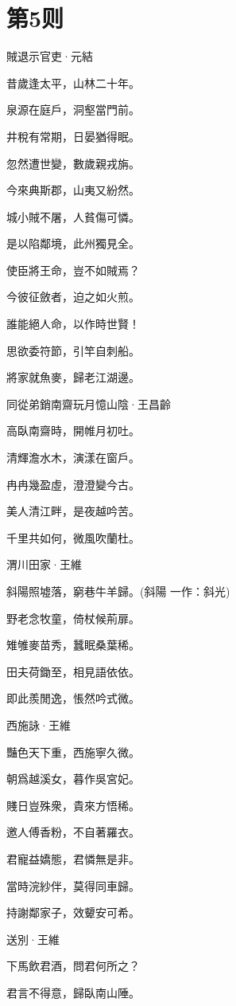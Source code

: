 \documentclass[12pt,a4paper]{ctexbook}
\begin{document}
\section{第5则}
賊退示官吏·元結\par
昔歲逢太平，山林二十年。\par
泉源在庭戶，洞壑當門前。\par
井稅有常期，日晏猶得眠。\par
忽然遭世變，數歲親戎旃。\par
今來典斯郡，山夷又紛然。\par
城小賊不屠，人貧傷可憐。\par
是以陷鄰境，此州獨見全。\par
使臣將王命，豈不如賊焉？\par
今彼征斂者，迫之如火煎。\par
誰能絕人命，以作時世賢！\par
思欲委符節，引竿自刺船。\par
將家就魚麥，歸老江湖邊。\par
同從弟銷南齋玩月憶山陰·王昌齡\par
高臥南齋時，開帷月初吐。\par
清輝澹水木，演漾在窗戶。\par
冉冉幾盈虛，澄澄變今古。\par
美人清江畔，是夜越吟苦。\par
千里共如何，微風吹蘭杜。\par
渭川田家·王維\par
斜陽照墟落，窮巷牛羊歸。(斜陽 一作：斜光)\par
野老念牧童，倚杖候荊扉。\par
雉雊麥苗秀，蠶眠桑葉稀。\par
田夫荷鋤至，相見語依依。\par
即此羨閒逸，悵然吟式微。\par
西施詠·王維\par
豔色天下重，西施寧久微。\par
朝爲越溪女，暮作吳宮妃。\par
賤日豈殊衆，貴來方悟稀。\par
邀人傅香粉，不自著羅衣。\par
君寵益嬌態，君憐無是非。\par
當時浣紗伴，莫得同車歸。\par
持謝鄰家子，效顰安可希。\par
送別·王維\par
下馬飲君酒，問君何所之？\par
君言不得意，歸臥南山陲。\par
\end{document}
